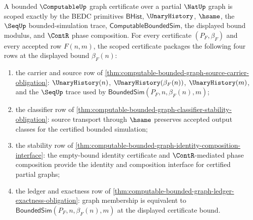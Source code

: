 
\begin{theorem}
\label{thm:computable-bounded-graph-scoped-certificate}
A bounded $\ComputableUp$ graph certificate over a partial $\NatUp$ graph is scoped exactly by the BEDC primitives $\mathsf{BHist}$, $\UnaryHistory$, $\hsame$, the $\SeqUp$ bounded-simulation trace, $\mathsf{ComputableBoundedSim}$, the displayed bound modulus, and $\ContR$ phase composition. For every certificate $(P_F,\beta_F)$ and every accepted row $F(n,m)$, the scoped certificate packages the following four rows at the displayed bound $\beta_F(n)$:
\begin{enumerate}
  \item the carrier and source row of \autoref{thm:computable-bounded-graph-source-carrier-obligation}: $\UnaryHistory(n)$, $\UnaryHistory(\beta_F(n))$, $\UnaryHistory(m)$, and the $\SeqUp$ trace used by $\mathsf{BoundedSim}(P_F,n,\beta_F(n),m)$;
  \item the classifier row of \autoref{thm:computable-bounded-graph-classifier-stability-obligation}: source transport through $\hsame$ preserves accepted output classes for the certified bounded simulation;
  \item the stability row of \autoref{thm:computable-bounded-graph-identity-composition-interface}: the empty-bound identity certificate and $\ContR$-mediated phase composition provide the identity and composition interface for certified partial graphs;
  \item the ledger and exactness row of \autoref{thm:computable-bounded-graph-ledger-exactness-obligation}: graph membership is equivalent to $\mathsf{BoundedSim}(P_F,n,\beta_F(n),m)$ at the displayed certificate bound.
\end{enumerate}
\end{theorem}

